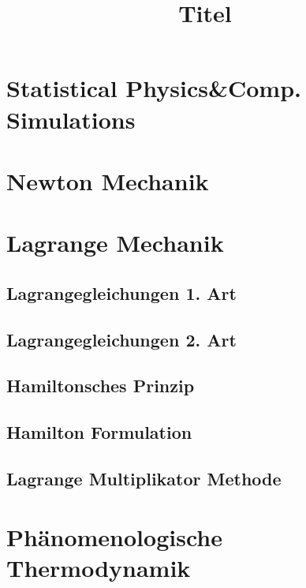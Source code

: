 \documentclass[
    fourColumns,
    landscape,
]{formularyETH/formularyETH}
\title{Titel}
\begin{document}
\section*{Statistical Physics\&Comp. Simulations}
\section{Newton Mechanik}
	
	\label{sec:newtonMechanik}
\section{Lagrange Mechanik}
\label{sec:LagrangeMechanik}
  \subsection{Lagrangegleichungen 1. Art}
  \label{subsec:Lagrangegleichungen1Art}
  
  \subsection{Lagrangegleichungen 2. Art}
  \label{subsec:Lagrangegleichungen2Art}
  
  \subsection{Hamiltonsches Prinzip}
  \label{subsec:hamiltonPrinciple}
  
  \subsection{Hamilton Formulation}
  \label{subsec:hamiltonFormulation}
  
  \subsection{Lagrange Multiplikator Methode}
  \label{subsec:LagrangeMultiplikator}
  
\newpage
\section{Phänomenologische Thermodynamik}

\newpage
\end{document}
